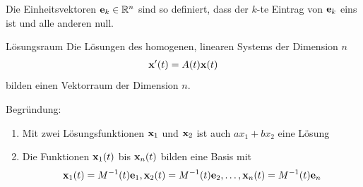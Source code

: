 \begin{Wdh}
  Die Einheitsvektoren $\mathbf{e}_k\in \mathbb R^n$ sind so definiert, dass der
  $k$-te Eintrag von $\mathbf{e}_k$ eins ist und alle anderen null.
\end{Wdh}


\begin{frame}
  \begin{block}{Lösungsraum}
    Die Lösungen des homogenen, linearen Systems der Dimension $n$
    \begin{gather*}
      \mathbf{x}'(t) = A(t)\mathbf{x}(t)
    \end{gather*}
    bilden einen Vektorraum der Dimension $n$.
  \end{block}
  \pause
  Begründung:
  \begin{enumerate}
  \item Mit zwei Lösungsfunktionen $\mathbf{x}_1$ und $\mathbf{x}_2$ ist auch
    $ax_1+bx_2$ eine Lösung
  \item Die Funktionen $\mathbf{x}_1(t)$ bis $\mathbf{x}_n(t)$ bilden eine Basis mit
    \begin{gather*}
      \mathbf{x}_1(t) = M^{-1}(t) \mathbf{e}_1, \mathbf{x}_2(t) = M^{-1}(t) \mathbf{e}_2,\dots, \mathbf{x}_n(t) = M^{-1}(t) \mathbf{e}_n
    \end{gather*}
  \end{enumerate}
\end{frame}

